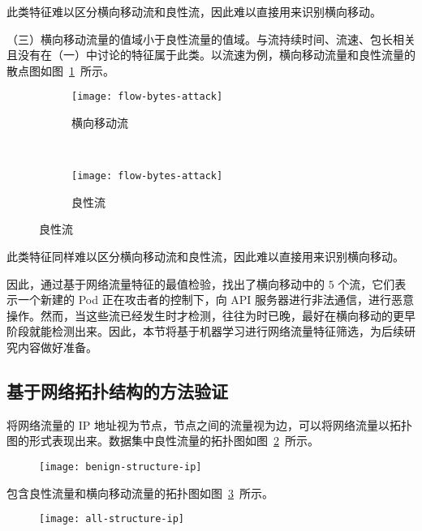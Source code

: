 {此类特征难以区分横向移动流和良性流，因此难以直接用来识别横向移动。

（三）横向移动流量的值域小于良性流量的值域。与流持续时间、流速、包长相关且没有在（一）中讨论的特征属于此类。以流速为例，横向移动流量和良性流量的散点图如图~\ref{fig:flow-bytes}~所示。

\begin{figure}[!htbp]
    \centering
    \begin{subfigure}[b]{0.48\textwidth}
      \texttt{[image: flow-bytes-attack]}
      \caption{横向移动流}
    \end{subfigure}%
    ~%
    \begin{subfigure}[b]{0.48\textwidth}
      \texttt{[image: flow-bytes-attack]}
      \caption{良性流}
    \end{subfigure}
    \label{fig:flow-bytes}
\end{figure}

此类特征同样难以区分横向移动流和良性流，因此难以直接用来识别横向移动。

因此，通过基于网络流量特征的最值检验，找出了横向移动中的 $5$ 个流，它们表示一个新建的 Pod 正在攻击者的控制下，向 API 服务器进行非法通信，进行恶意操作。然而，当这些流已经发生时才检测，往往为时已晚，最好在横向移动的更早阶段就能检测出来。因此，本节将基于机器学习进行网络流量特征筛选，为后续研究内容做好准备。

\subsection{基于网络拓扑结构的方法验证}

将网络流量的 IP 地址视为节点，节点之间的流量视为边，可以将网络流量以拓扑图的形式表现出来。数据集中良性流量的拓扑图如图~\ref{fig:benign-structure-ip}~所示。

\begin{figure}[!htbp]
    \centering
    \texttt{[image: benign-structure-ip]}
    \label{fig:benign-structure-ip}

\end{figure}

包含良性流量和横向移动流量的拓扑图如图~\ref{fig:all-structure-ip}~所示。

\begin{figure}[!htbp]
    \centering
    \texttt{[image: all-structure-ip]}
    \label{fig:all-structure-ip}


\end{figure}}
